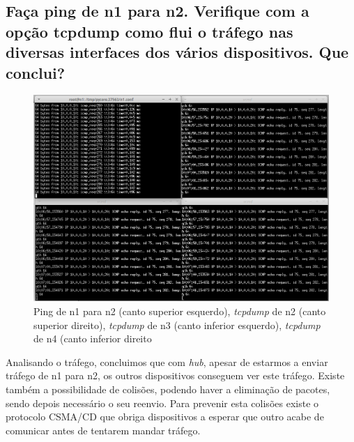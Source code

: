 \documentclass[a4paper]{article}
\begin{document}
\subsection{Faça ping de n1 para n2. Verifique com a opção tcpdump como flui o tráfego nas diversas interfaces dos vários dispositivos. Que conclui?}
\begin{figure}[H]
\centering
\includegraphics[scale=0.40]{pics/p17.png}
\caption{Ping de n1 para n2 (canto superior esquerdo), \textit{tcpdump} de n2 (canto superior direito), \textit{tcpdump} de n3 (canto inferior esquerdo), \textit{tcpdump} de n4 (canto inferior direito} %
\end{figure}
Analisando o tráfego, concluimos que com \textit{hub}, apesar de estarmos a enviar tráfego de n1 para n2, os outros dispositivos conseguem ver este tráfego. Existe também a possibilidade de colisões, podendo haver a eliminação de pacotes, sendo depois necessário o seu reenvio. Para prevenir esta colisões existe o protocolo CSMA/CD que obriga dispositivos a esperar que outro acabe de comunicar antes de tentarem mandar tráfego.
\end{document}
